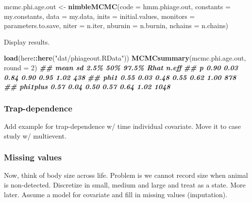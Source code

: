 \documentclass[
  12pt,
]{krantz}
\newenvironment{Shaded}{\begin{snugshade}}{\end{snugshade}}
\newcommand{\AttributeTok}[1]{\textcolor[rgb]{0.13,0.29,0.53}{#1}}
\newcommand{\DecValTok}[1]{\textcolor[rgb]{0.00,0.00,0.81}{#1}}
\newcommand{\DocumentationTok}[1]{\textcolor[rgb]{0.56,0.35,0.01}{\textbf{\textit{#1}}}}
\newcommand{\FunctionTok}[1]{\textcolor[rgb]{0.13,0.29,0.53}{\textbf{#1}}}
\newcommand{\NormalTok}[1]{#1}
\newcommand{\OtherTok}[1]{\textcolor[rgb]{0.56,0.35,0.01}{#1}}
\newcommand{\SpecialCharTok}[1]{\textcolor[rgb]{0.81,0.36,0.00}{\textbf{#1}}}
\newcommand{\StringTok}[1]{\textcolor[rgb]{0.31,0.60,0.02}{#1}}
\begin{document}
\begin{Shaded}
\begin{Highlighting}[]
\NormalTok{mcmc.phi.age.out }\OtherTok{\textless{}{-}} \FunctionTok{nimbleMCMC}\NormalTok{(}\AttributeTok{code =}\NormalTok{ hmm.phiage.out, }
                               \AttributeTok{constants =}\NormalTok{ my.constants,}
                               \AttributeTok{data =}\NormalTok{ my.data,              }
                               \AttributeTok{inits =}\NormalTok{ initial.values,}
                               \AttributeTok{monitors =}\NormalTok{ parameters.to.save,}
                               \AttributeTok{niter =}\NormalTok{ n.iter,}
                               \AttributeTok{nburnin =}\NormalTok{ n.burnin, }
                               \AttributeTok{nchains =}\NormalTok{ n.chains)}
\end{Highlighting}
\end{Shaded}

Display results.

\begin{Shaded}
\begin{Highlighting}[]
\FunctionTok{load}\NormalTok{(here}\SpecialCharTok{::}\FunctionTok{here}\NormalTok{(}\StringTok{"dat/phiageout.RData"}\NormalTok{))}
\FunctionTok{MCMCsummary}\NormalTok{(mcmc.phi.age.out, }\AttributeTok{round =} \DecValTok{2}\NormalTok{)}
\DocumentationTok{\#\#          mean   sd 2.5\%  50\% 97.5\% Rhat n.eff}
\DocumentationTok{\#\# p        0.90 0.03 0.84 0.90  0.95 1.02   438}
\DocumentationTok{\#\# phi1     0.55 0.03 0.48 0.55  0.62 1.00   878}
\DocumentationTok{\#\# phi1plus 0.57 0.04 0.50 0.57  0.64 1.02  1048}
\end{Highlighting}
\end{Shaded}

\hypertarget{trap-dependence}{%
\subsubsection{Trap-dependence}\label{trap-dependence}}

Add example for trap-dependence w/ time individual covariate. Move it to case study w/ multievent.

\hypertarget{missing-values}{%
\subsubsection{Missing values}\label{missing-values}}

Now, think of body size across life. Problem is we cannot record size when animal is non-detected. Discretize in small, medium and large and treat as a state. More later. Assume a model for covariate and fill in missing values (imputation).
\end{document}
